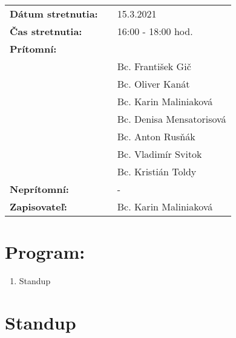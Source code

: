 \documentclass{article}
\begin{document}
    

    \begin{table}[h]
        \begin{tabular}{lllll}
            \multicolumn{3}{l}{\textbf{Dátum stretnutia:}} & & 15.3.2021 \\
            \multicolumn{3}{l}{\textbf{Čas stretnutia:}} & & 16:00 - 18:00 hod. \\
            \multicolumn{3}{l}{\textbf{Prítomní:}} \\
            & & & & Bc. František Gič  \\
            & & & & Bc. Oliver Kanát \\
            & & & & Bc. Karin Maliniaková \\
            & & & & Bc. Denisa Mensatorisová \\
            & & & & Bc. Anton Rusňák \\
            & & & & Bc. Vladimír Svitok \\
            & & & & Bc. Kristián Toldy \\
            \multicolumn{3}{l}{\textbf{Neprítomní:}} & & -\\
            \multicolumn{3}{l}{\textbf{Zapisovateľ:}} & & Bc. Karin Maliniaková \\
        \end{tabular}
        \label{tab:grades}
    \end{table}

    \section*{Program:}

    \begin{enumerate}
        \item Standup
    \end{enumerate}

    \section*{Standup}
\end{document}
